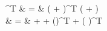 ^T  & = & (  + \nabla {})^T ( + \nabla {}) \\
                        & = &  + \nabla {} + (\nabla {})^T + (\nabla {} )^T \nabla {}
